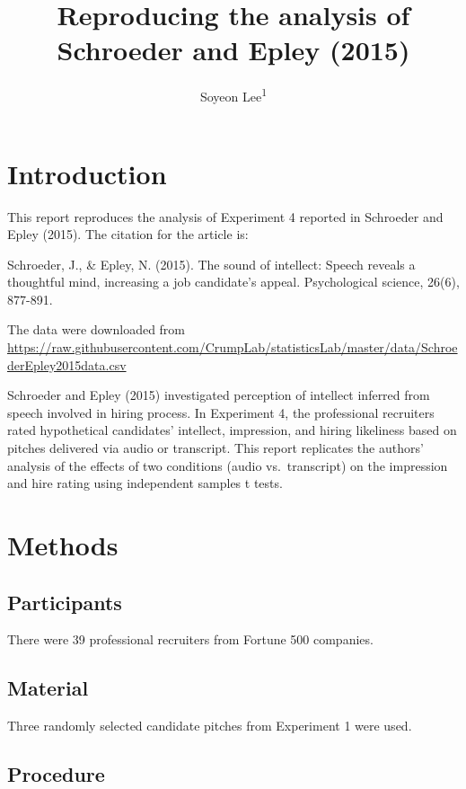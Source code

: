 \documentclass[
  english,
  man]{apa6}
\title{Reproducing the analysis of Schroeder and Epley (2015)}
\author{Soyeon Lee\textsuperscript{1}}
\date{}
\affiliation{\vspace{0.5cm}\textsuperscript{1} Brooklyn College of the City University of New York}
\begin{document}
\maketitle

\hypertarget{introduction}{%
\section{Introduction}\label{introduction}}

This report reproduces the analysis of Experiment 4 reported in Schroeder and Epley (2015). The citation for the article is:

Schroeder, J., \& Epley, N. (2015). The sound of intellect: Speech reveals a thoughtful mind, increasing a job candidate's appeal. Psychological science, 26(6), 877-891.

The data were downloaded from \url{https://raw.githubusercontent.com/CrumpLab/statisticsLab/master/data/SchroederEpley2015data.csv}

Schroeder and Epley (2015) investigated perception of intellect inferred from speech involved in hiring process. In Experiment 4, the professional recruiters rated hypothetical candidates' intellect, impression, and hiring likeliness based on pitches delivered via audio or transcript. This report replicates the authors' analysis of the effects of two conditions (audio vs.~transcript) on the impression and hire rating using independent samples t tests.

\hypertarget{methods}{%
\section{Methods}\label{methods}}

\hypertarget{participants}{%
\subsection{Participants}\label{participants}}

There were 39 professional recruiters from Fortune 500 companies.

\hypertarget{material}{%
\subsection{Material}\label{material}}

Three randomly selected candidate pitches from Experiment 1 were used.

\hypertarget{procedure}{%
\subsection{Procedure}\label{procedure}}
\end{document}
